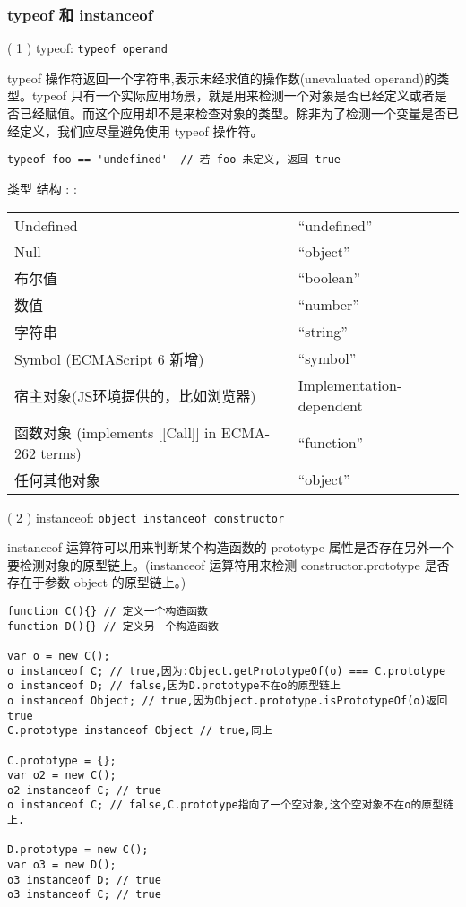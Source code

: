 \subsubsection{typeof 和 instanceof}\hypertarget{typeof--instanceof}{}\label{typeof--instanceof}

( 1 ) typeof: \texttt{typeof operand}

typeof 操作符返回一个字符串,表示未经求值的操作数(unevaluated operand)的类型。typeof 只有一个实际应用场景，就是用来检测一个对象是否已经定义或者是否已经赋值。而这个应用却不是来检查对象的类型。除非为了检测一个变量是否已经定义，我们应尽量避免使用 typeof 操作符。

\begin{verbatim}typeof foo == 'undefined'  // 若 foo 未定义, 返回 true
\end{verbatim}

类型      \textbar{} 结构
:
      \textbar{} :

\begin{longtable}{|l|l|}   %
\hline
Undefined & ``undefined''\\
Null & ``object''\\
布尔值 & ``boolean''\\
数值 & ``number''\\
字符串 & ``string''\\
Symbol (ECMAScript 6 新增) & ``symbol''\\
宿主对象(JS环境提供的，比如浏览器) & Implementation-dependent\\
函数对象 (implements [[Call]] in ECMA-262 terms) & ``function''\\
任何其他对象 & ``object''\\
\hline
\end{longtable}   %

( 2 ) instanceof: \texttt{object instanceof constructor}

instanceof 运算符可以用来判断某个构造函数的 prototype 属性是否存在另外一个要检测对象的原型链上。(instanceof 运算符用来检测 constructor.prototype 是否存在于参数 object 的原型链上。)

\begin{verbatim}function C(){} // 定义一个构造函数
function D(){} // 定义另一个构造函数

var o = new C();
o instanceof C; // true,因为:Object.getPrototypeOf(o) === C.prototype
o instanceof D; // false,因为D.prototype不在o的原型链上
o instanceof Object; // true,因为Object.prototype.isPrototypeOf(o)返回true
C.prototype instanceof Object // true,同上

C.prototype = {};
var o2 = new C();
o2 instanceof C; // true
o instanceof C; // false,C.prototype指向了一个空对象,这个空对象不在o的原型链上.

D.prototype = new C();
var o3 = new D();
o3 instanceof D; // true
o3 instanceof C; // true
\end{verbatim}

